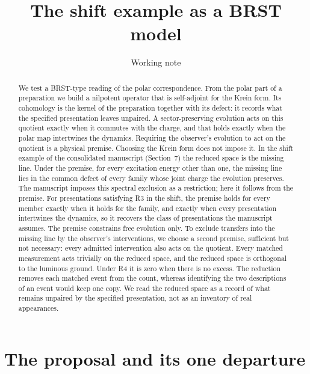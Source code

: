\documentclass[11pt]{article}
\title{The shift example as a BRST model}
\author{Working note}
\date{}
\theoremstyle{remark}
\begin{document}
\maketitle

\begin{abstract}
\noindent
We test a BRST-type reading of the polar correspondence. From the polar part of a preparation we build a nilpotent operator that is self-adjoint for the Krein form. Its cohomology is the kernel of the preparation together with its defect: it records what the specified presentation leaves unpaired. A sector-preserving evolution acts on this quotient exactly when it commutes with the charge, and that holds exactly when the polar map intertwines the dynamics. Requiring the observer's evolution to act on the quotient is a physical premise. Choosing the Krein form does not impose it. In the shift example of the consolidated manuscript (Section~7) the reduced space is the missing line. Under the premise, for every excitation energy other than one, the missing line lies in the common defect of every family whose joint charge the evolution preserves. The manuscript imposes this spectral exclusion as a restriction; here it follows from the premise. For presentations satisfying R3 in the shift, the premise holds for every member exactly when it holds for the family, and exactly when every presentation intertwines the dynamics, so it recovers the class of presentations the manuscript assumes. The premise constrains free evolution only. To exclude transfers into the missing line by the observer's interventions, we choose a second premise, sufficient but not necessary: every admitted intervention also acts on the quotient. Every matched measurement acts trivially on the reduced space, and the reduced space is orthogonal to the luminous ground. Under R4 it is zero when there is no excess. The reduction removes each matched event from the count, whereas identifying the two descriptions of an event would keep one copy. We read the reduced space as a record of what remains unpaired by the specified presentation, not as an inventory of real appearances.
\end{abstract}

\section{The proposal and its one departure}
\end{document}
